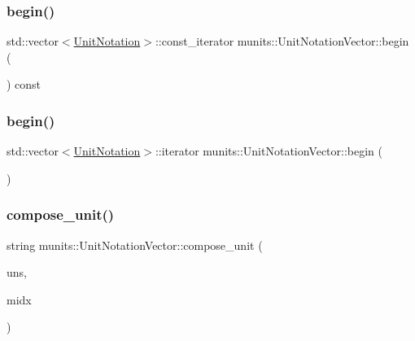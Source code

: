 \subsubsection{\texorpdfstring{begin()}{begin()}\hspace{0.1cm}{\footnotesize\ttfamily [1/2]}}
{\footnotesize\ttfamily std\+::vector$<$\hyperlink{classmunits_1_1_unit_notation}{Unit\+Notation}$>$\+::const\+\_\+iterator munits\+::\+Unit\+Notation\+Vector\+::begin (\begin{DoxyParamCaption}{ }\end{DoxyParamCaption}) const\hspace{0.3cm}{\ttfamily [inline]}}

\mbox{\label{classmunits_1_1_unit_notation_vector_a519b16aa356a461d33ebf563bf65f124}} 
\subsubsection{\texorpdfstring{begin()}{begin()}\hspace{0.1cm}{\footnotesize\ttfamily [2/2]}}
{\footnotesize\ttfamily std\+::vector$<$\hyperlink{classmunits_1_1_unit_notation}{Unit\+Notation}$>$\+::iterator munits\+::\+Unit\+Notation\+Vector\+::begin (\begin{DoxyParamCaption}{ }\end{DoxyParamCaption})\hspace{0.3cm}{\ttfamily [inline]}}

\mbox{\label{classmunits_1_1_unit_notation_vector_a8d21171d845542dc43aae9b054d0c923}} 
\subsubsection{\texorpdfstring{compose\+\_\+unit()}{compose\_unit()}}
{\footnotesize\ttfamily string munits\+::\+Unit\+Notation\+Vector\+::compose\+\_\+unit (\begin{DoxyParamCaption}\item[{const \hyperlink{classmunits_1_1_unit_notation_vector}{Unit\+Notation\+Vector} \&}]{uns,  }\item[{const int}]{midx }\end{DoxyParamCaption})\hspace{0.3cm}{\ttfamily [static]}}

